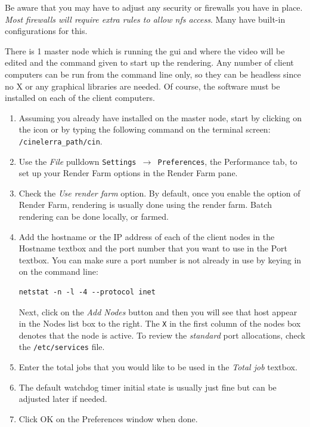 \begin{description}
\begin{enumerate}
    Be aware that you may have to adjust any security or firewalls
    you have in place.  \textit{Most firewalls will require extra rules
      to allow nfs access}.  Many have built-in configurations for this.
  \end{enumerate}
\item[Configure Rendering on Master Node] There is 1 master node
  which is running the \CGG{} gui and where the video will be edited
  and the command given to start up the rendering.  Any number of
  client computers can be run from the command line only, so they can
  be headless since no X or any graphical libraries are needed.  Of
  course, the \CGG{} software must be installed on each of the client
  computers.
  \begin{enumerate}
  \item Assuming you already have \CGG{} installed on the master
    node, start \CGG{} by clicking on the icon or by typing the
    following command on the terminal screen:
    \texttt{/{cinelerra\_path}/cin}.
  \item Use the \textit{File} pulldown \texttt{Settings $\rightarrow$
      Preferences}, the Performance tab, to set up your Render Farm
    options in the Render Farm pane.
  \item Check the \textit{Use render farm} option.  By default, once
    you enable the option of Render Farm, rendering is usually done
    using the render farm.  Batch rendering can be done locally, or
    farmed.
  \item Add the hostname or the IP address of each of the client
    nodes in the Hostname textbox and the port number that you want to
    use in the Port textbox.  You can make sure a port number is not
    already in use by keying in on the command line:
\begin{lstlisting}[style=sh]
netstat -n -l -4 --protocol inet
\end{lstlisting} Next, click on the \textit{Add Nodes} button and
    then you will see that host appear in the Nodes list box to the
    right.  The \texttt{X} in the first column of the nodes box denotes
    that the node is active.  To review the \textit{standard} port
    allocations, check the \texttt{/etc/services} file.
  \item Enter the total jobs that you would like to be used in the
    \textit{Total job} textbox.
  \item The default watchdog timer initial state is usually just
    fine but can be adjusted later if needed.
  \item Click OK on the Preferences window when done.

\end{enumerate}
\end{description}
